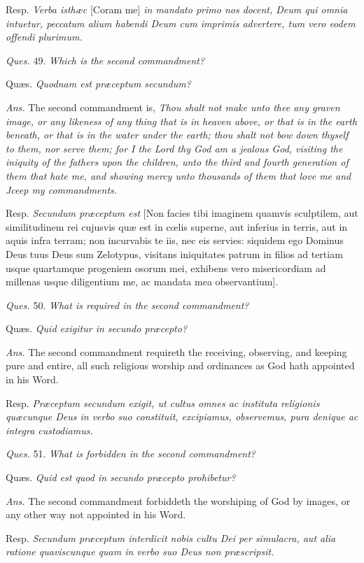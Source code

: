Resp. \emph{Verba isthæc} [Coram me] \emph{in mandato primo nos docent, Deum qui omnia intuetur, peccatum alium habendi Deum cum imprimis advertere, tum vero eodem offendi plurimum.}

\emph{Ques.} 49. \emph{Which is the second commandment?}

Quæs. \emph{Quodnam est præceptum secundum?}

\emph{Ans.} The second commandment is, \emph{Thou shalt not make unto thee any graven image, or any likeness of any thing that is in heaven above, or that is in the earth beneath, or that is in the water under the earth; thou shalt not bow down thyself to them, nor serve them; for I the Lord thy God am a jealous God, visiting the iniquity of the fathers upon the children, unto the third and fourth generation of them that hate me, and showing mercy unto thousands of them that love me and Jceep my commandments.}

Resp. \emph{Secundum præceptum est} [Non facies tibi imaginem quamvis sculptilem, aut similitudinem rei cujusvis quæ est in cœlis superne, aut inferius in terris, aut in aquis infra terram; non incurvabis te iis, nec eis servies: siquidem ego Dominus Deus tuus Deus sum Zelotypus, visitans iniquitates patrum in filios ad tertiam usque quartamque progeniem osorum mei, exhibens vero misericordiam ad millenas usque diligentium me, ac mandata mea observantium].

\emph{Ques.} 50. \emph{What is required in the second commandment?}

Quæs. \emph{Quid exigitur in secundo præcepto?}

\emph{Ans.} The second commandment requireth the receiving, observing, and keeping pure and entire, all such religious worship and ordinances as God hath appointed in his Word.

Resp. \emph{Præceptum secundum exigit, ut cultus omnes ac instituta religionis quæcunque Deus in verbo suo constituit, excipiamus, observemus, pura denique ac integra custodiamus.}

\emph{Ques.} 51. \emph{What is forbidden in the second commandment?}

Quæs. \emph{Quid est quod in secundo præcepto prohibetur?}

\emph{Ans.} The second commandment forbiddeth the worshiping of God by images, or any other way not appointed in his Word.

Resp. \emph{Secundum præceptum interdicit nobis cultu Dei per simulacra, aut alia ratione quaviscunque quam in verbo suo Deus non præscripsit.}

